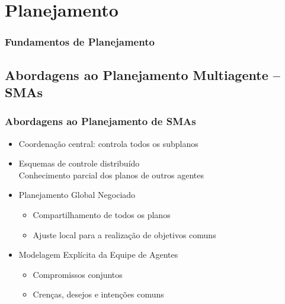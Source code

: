 \section{Planejamento}


\begin{frame}
\frametitle{Fundamentos de Planejamento}



\end{frame}


\subsection{Abordagens ao Planejamento Multiagente -- SMAs}

\begin{frame}
\frametitle{Abordagens ao Planejamento de SMAs}

\begin{block}{}
 
\begin{itemize}
  \item Coordenação central: controla todos os subplanos
  \item Esquemas de controle distribuído\\
        Conhecimento parcial dos planos de outros agentes
  \item Planejamento Global Negociado

\begin{itemize}
  \item Compartilhamento de todos os planos
  \item Ajuste local para a realização de objetivos comuns

\end{itemize}

\item Modelagem Explícita da Equipe de Agentes
\begin{itemize}
  \item Compromissos conjuntos
   \item Crenças, desejos e intenções comuns

\end{itemize}
\end{itemize}
\end{block}

\end{frame}



